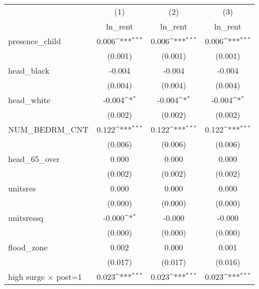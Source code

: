 {
\def\sym#1{\ifmmode^{#1}\else\(^{#1}\)\fi}
\begin{tabular}{l*{3}{c}}
\toprule
                    &\multicolumn{1}{c}{(1)}&\multicolumn{1}{c}{(2)}&\multicolumn{1}{c}{(3)}\\
                    &\multicolumn{1}{c}{ln\_rent}&\multicolumn{1}{c}{ln\_rent}&\multicolumn{1}{c}{ln\_rent}\\
\midrule
presence\_child      &       0.006\sym{***}&       0.006\sym{***}&       0.006\sym{***}\\
                    &     (0.001)         &     (0.001)         &     (0.001)         \\
\addlinespace
head\_black          &      -0.004         &      -0.004         &      -0.004         \\
                    &     (0.004)         &     (0.004)         &     (0.004)         \\
\addlinespace
head\_white          &      -0.004\sym{*}  &      -0.004\sym{*}  &      -0.004\sym{*}  \\
                    &     (0.002)         &     (0.002)         &     (0.002)         \\
\addlinespace
NUM\_BEDRM\_CNT       &       0.122\sym{***}&       0.122\sym{***}&       0.122\sym{***}\\
                    &     (0.006)         &     (0.006)         &     (0.006)         \\
\addlinespace
head\_65\_over        &       0.000         &       0.000         &       0.000         \\
                    &     (0.002)         &     (0.002)         &     (0.002)         \\
\addlinespace
unitsres            &       0.000         &       0.000         &       0.000         \\
                    &     (0.000)         &     (0.000)         &     (0.000)         \\
\addlinespace
unitsressq          &      -0.000\sym{*}  &      -0.000         &      -0.000         \\
                    &     (0.000)         &     (0.000)         &     (0.000)         \\
\addlinespace
flood\_zone          &       0.002         &       0.000         &       0.001         \\
                    &     (0.017)         &     (0.017)         &     (0.016)         \\
\addlinespace
high surge $\times$ post=1&       0.023\sym{***}&       0.023\sym{***}&       0.023\sym{***}\\

\end{tabular}}
